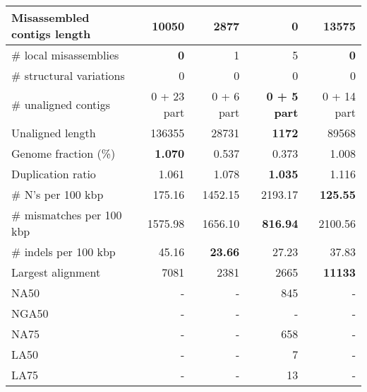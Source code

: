 \documentclass[12pt,a4paper]{article}
\begin{document}
\begin{table}[ht]
\begin{center}
\begin{tabular}{|l*{4}{|r}|}
Misassembled contigs length & 10050 & 2877 & {\bf 0} & 13575 \\ \hline
\# local misassemblies & {\bf 0} & 1 & 5 & {\bf 0} \\ \hline
\# structural variations & 0 & 0 & 0 & 0 \\ \hline
\# unaligned contigs & 0 + 23 part & 0 + 6 part & {\bf 0 + 5 part} & 0 + 14 part \\ \hline
Unaligned length & 136355 & 28731 & {\bf 1172} & 89568 \\ \hline
Genome fraction (\%) & {\bf 1.070} & 0.537 & 0.373 & 1.008 \\ \hline
Duplication ratio & 1.061 & 1.078 & {\bf 1.035} & 1.116 \\ \hline
\# N's per 100 kbp & 175.16 & 1452.15 & 2193.17 & {\bf 125.55} \\ \hline
\# mismatches per 100 kbp & 1575.98 & 1656.10 & {\bf 816.94} & 2100.56 \\ \hline
\# indels per 100 kbp & 45.16 & {\bf 23.66} & 27.23 & 37.83 \\ \hline
Largest alignment & 7081 & 2381 & 2665 & {\bf 11133} \\ \hline
NA50 & - & - & 845 & - \\ \hline
NGA50 & - & - & - & - \\ \hline
NA75 & - & - & 658 & - \\ \hline
LA50 & - & - & 7 & - \\ \hline
LA75 & - & - & 13 & - \\ \hline
\end{tabular}
\end{center}
\end{table}
\end{document}
